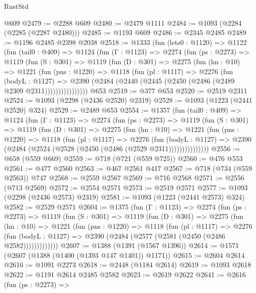 \begin{lexlean}{RustStd}
\begin{coremodule}
    @609
@2479 := @2288 @609
@2480 := @2479 @1111
@2484 := @1093 (@2284 (@2285 (@2287 @2480)))
@2485 := @1193 @609
@2486 := @2345 @2485
@2489 := @1196 @2485 @2398 @2038
@2518 := @1333
    (fun (lets0 : @1120) =>
    @1122
      (fun (tail0 : @409) =>
      @1124
        (fun (Γ : @1123) =>
        @2274
          (fun (ps : @2273) =>
          @1119
            (fun (S : @301) =>
            @1119
              (fun (D : @301) =>
              @2275
                (fun (hn : @10) =>
                @1221
                  (fun (pns : @1220) =>
                  @1118
                    (fun (pl : @1117) =>
                    @2276
                      (fun (bodyL : @1127) =>
                      @2390 (@2484 (@2440 (@2445 (@2450 (@2486 (@2489 @2309 @2311))))))))))))))))
    @653
@2519 := @377 @653
@2520 := @2519 @2311
@2524 := @1093 (@2298 (@2436 @2520) @2319)
@2528 := @1093 (@1223 (@2441 @2520) @324)
@2529 := @2489 @653
@2554 := @1357
    (fun (tail0 : @409) =>
    @1124
      (fun (Γ : @1123) =>
      @2274
        (fun (ps : @2273) =>
        @1119
          (fun (S : @301) =>
          @1119
            (fun (D : @301) =>
            @2275
              (fun (hn : @10) =>
              @1221
                (fun (pns : @1220) =>
                @1118
                  (fun (pl : @1117) =>
                  @2276
                    (fun (bodyL : @1127) =>
                    @2390 (@2484 (@2524 (@2528 (@2450 (@2486 (@2529 @2311)))))))))))))))
@2556 := @658 (@559 @669)
@2559 := @718 (@721 (@559 @725))
@2560 := @476 @553
@2561 := @477 @2560
@2563 := @467 @2561 @417
@2567 := @718 (@734 (@559 @2563)) @747
@2568 := @2559 @2567
@2569 := @716 @2568
@2571 := @2556 (@713 @2569)
@2572 := @2554 @2571
@2573 := @2519 @2571
@2577 := @1093 (@2298 (@2436 @2573) @2319)
@2581 := @1093 (@1223 (@2441 @2573) @324)
@2582 := @2529 @2571
@2604 := @1375
    (fun (Γ : @1123) =>
    @2274
      (fun (ps : @2273) =>
      @1119
        (fun (S : @301) =>
        @1119
          (fun (D : @301) =>
          @2275
            (fun (hn : @10) =>
            @1221
              (fun (pns : @1220) =>
              @1118
                (fun (pl : @1117) =>
                @2276
                  (fun (bodyL : @1127) =>
                  @2390 (@2484 (@2577 (@2581 (@2450 (@2486 @2582)))))))))))))
@2607 := @1388 (@1391 (@1567 @1396))
@2614 := @1571 (@2607 (@1388 (@1400 (@1393 @147 @1401)) @1171))
@2615 := @2604 @2614
@2616 := @1091 @2273
@2618 := @2448 (@1184 @2614)
@2619 := @1093 @2618
@2622 := @1191 @2614 @2485 @2582
@2623 := @2619 @2622
@2641 := @2616
    (fun (ps : @2273) =>

\end{coremodule}
\end{lexlean}
